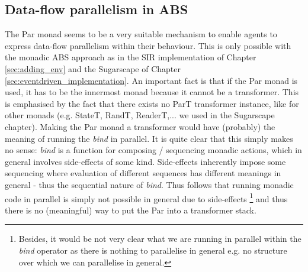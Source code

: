 \subsection{Data-flow parallelism in ABS}
The Par monad seems to be a very suitable mechanism to enable agents to express data-flow parallelism within their behaviour. This is only possible with the monadic ABS approach as in the SIR implementation of Chapter \ref{sec:adding_env} and the Sugarscape of Chapter \ref{sec:eventdriven_implementation}. An important fact is that if the Par monad is used, it has to be the innermost monad because it cannot be a transformer. This is emphasised by the fact that there exists no ParT transformer instance, like for other monads (e.g. StateT, RandT, ReaderT,... we used in the Sugarscape chapter). Making the Par monad a transformer would have (probably) the meaning of running the \textit{bind} in parallel. It is quite clear that this simply makes no sense: \textit{bind} is a function for composing / sequencing monadic actions, which in general involves side-effects of some kind. Side-effects inherently impose some sequencing where evaluation of different sequences has different meanings in general - thus the sequential nature of \textit{bind}. Thus follows that running monadic code in parallel is simply not possible in general due to side-effects \footnote{Besides, it would be not very clear what we are running in parallel within the \textit{bind} operator as there is nothing to parallelise in general e.g. no structure over which we can parallelise in general.} and thus there is no (meaningful) way to put the Par into a transformer stack.